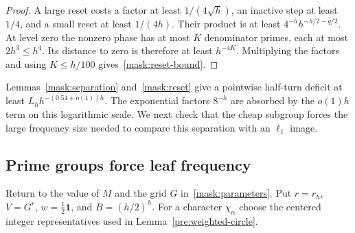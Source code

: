\begin{proof}
A large reset costs a factor at least $1/(4\sqrt h)$, an inactive step at
least $1/4$, and a small reset at least $1/(4h)$. Their product is at least
$4^{-h}h^{-h/2-q/2}$. At level zero the nonzero phase has at most $K$
denominator primes, each at most $2h^3\leq h^4$. Its distance to zero is
therefore at least $h^{-4K}$. Multiplying the factors and using
$K\leq h/100$ gives~\eqref{mask:reset-bound}.
\end{proof}

Lemmas~\ref{mask:separation} and~\ref{mask:reset} give a pointwise half-turn
deficit at least $L_hh^{-(0.54+o(1))h}$. The exponential factors $8^{-h}$
are absorbed by the $o(1)h$ term on this logarithmic scale. We next check
that the cheap subgroup forces the large frequency size needed to compare
this separation with an $\ell_1$ image.



\subsection{Prime groups force leaf frequency}
Return to the value of $M$ and the grid $G$ in~\eqref{mask:parameters}.
Put $r=r_h$, $V=G^r$, $w=\tfrac12\mathbf1$, and $B=(h/2)^h$. For a character
$\chi_\alpha$ choose the centered integer representatives used in
Lemma~\ref{pre:weighted-circle}.

